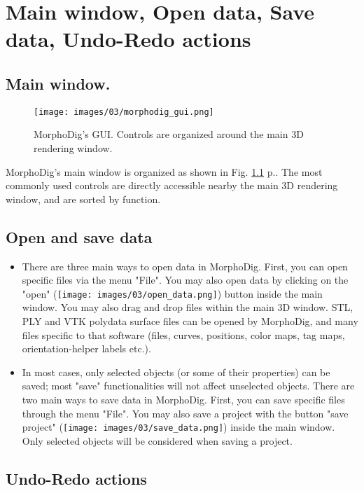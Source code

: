 \chapter{Main window, Open data, Save data, Undo-Redo actions}
\minitoc  

\section{Main window.}
\begin{figure}
  \centering
  \texttt{[image: images/03/morphodig\_gui.png]} 
	\caption{MorphoDig's GUI. Controls are organized around the main 3D rendering window.}
\label{gui}
 
\end{figure}

MorphoDig's main window is organized as shown in Fig. \ref{gui} p.\pageref{gui}. The most commonly used controls are directly accessible nearby the main 3D rendering window, and are sorted by function. 

 \section{Open and save data}


\begin{itemize}
\item There are three main ways to open data in MorphoDig. First, you can open specific files via the menu "File". You may also open data by clicking on the "open" (\texttt{[image: images/03/open\_data.png]}) button inside the main window. You may also drag and drop files within the main 3D window.  
STL, PLY and VTK polydata surface files can be opened by MorphoDig, and many files specific to that software (files, curves, positions, color maps, tag maps, orientation-helper labels etc.).
\item In most cases, only selected objects (or some of their properties) can be saved; most "save" functionalities will not affect unselected objects. There are two main ways to save data in MorphoDig. First, you can save specific files through the menu "File". You may also save a project with the button "save project" (\texttt{[image: images/03/save\_data.png]})  inside the main window. Only selected objects will be considered when saving a project.
\end{itemize}





\section{Undo-Redo actions}

